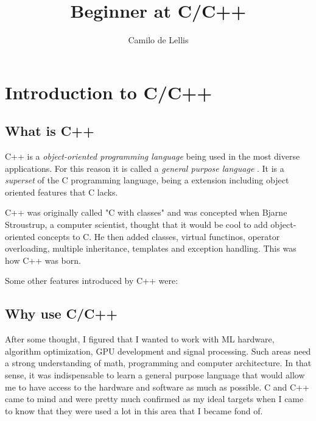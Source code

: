 \documentclass{article}
\title{Beginner at C/C++}
\author{Camilo de Lellis}
\begin{document}
\maketitle
\tableofcontents

\section{Introduction to C/C++}


\subsection{What is C++}
C++ is a \textit{object-oriented programming language} being used in the most diverse applications. For this reason it is called a \textit{general purpose language} \cite{wikibooks_cpp}. It is a \textit{superset} of the C programming language, being a extension including object oriented features that C lacks.

C++ was originally called "C with classes" and was concepted when Bjarne Stroustrup, a computer scientist, thought that it would be cool to add object-oriented concepts to C. He then added classes, virtual functinos, operator overloading, multiple inheritance, templates and exception handling. This was how C++ was born. \cite{wikibooks_cpp}

Some other features introduced by C++ were:

\cite{wikibooks_cpp}


\subsection{Why use C/C++}

After some thought, I figured that I wanted to work with ML hardware, algorithm optimization, GPU development and signal processing. Such areas need a strong understanding of math, programming and computer architecture. In that sense, it was indispensable to learn a general purpose language that would allow me to have access to the hardware and software as much as possible. C and C++ came to mind and were pretty much confirmed as my ideal targets when I came to know that they were used a lot in this area that I became fond of. 
\end{document}
